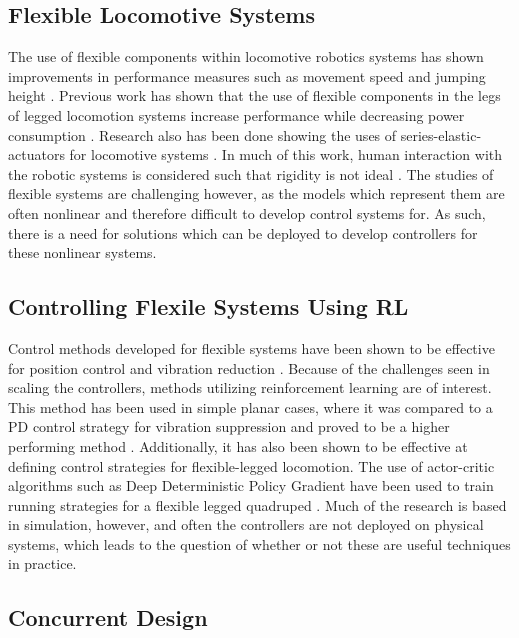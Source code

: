 \documentclass[letterpaper, 10 pt, conference]{ieeeconf}  %
\begin{document}
\subsection{Flexible Locomotive Systems}

The use of flexible components within locomotive robotics systems has shown improvements in performance measures such as movement speed and jumping height \cite{Sugiyama2004, Hurst2008}. Previous work has shown that the use of flexible components in the legs of legged locomotion systems increase performance while decreasing power consumption \cite{Saranli2001}. Research also has been done showing the uses of series-elastic-actuators for locomotive systems \cite{Pratt1995}. In much of this work, human interaction with the robotic systems is considered such that rigidity is not ideal \cite{Zhang2019}. The studies of flexible systems are challenging however, as the models which represent them are often nonlinear and therefore difficult to develop control systems for. As such, there is a need for solutions which can be deployed to develop controllers for these nonlinear systems.

\subsection{Controlling Flexile Systems Using RL}

Control methods developed for flexible systems have been shown to be effective for position control and vibration reduction \cite{Luo1993, Ahmadi1997}. Because of the challenges seen in scaling the controllers, methods utilizing reinforcement learning are of interest. This method has been used in simple planar cases, where it was compared to a PD control strategy for vibration suppression and proved to be a higher performing method \cite{He2020f}. Additionally, it has also been shown to be effective at defining control strategies for flexible-legged locomotion. The use of actor-critic algorithms such as Deep Deterministic Policy Gradient \cite{Lillicrap2016h} have been used to train running strategies for a flexible legged quadruped \cite{Dwiel2019d}. Much of the research is based in simulation, however, and often the controllers are not deployed on physical systems, which leads to the question of whether or not these are useful techniques in practice.

\subsection{Concurrent Design}
\end{document}
